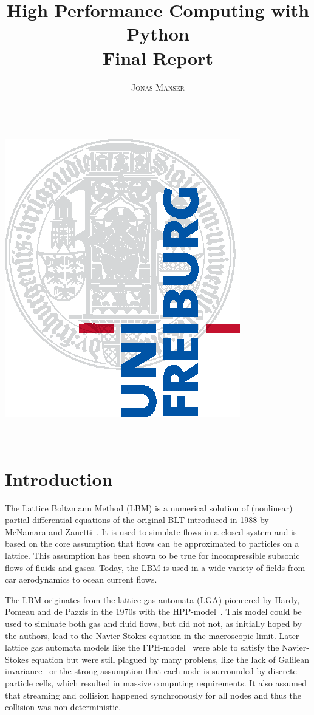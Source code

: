 \documentclass[a4paper,11pt]{article}
\title{\Huge \textbf{High Performance Computing with Python} \vspace{4mm} \\ \huge Final Report}
\author{\textsc{Jonas Manser} \\ \vspace{3mm}\text{matriculation number}  \\
\vspace{3mm}\text{jonas.burster@gmail.com}}
\begin{document}
\makeatletter
\begin{titlepage}
  \begin{center}
    \includegraphics[width=0.5\linewidth]{logos/Uni_Logo-Grundversion_E1_A4_CMYK.eps}\\[4ex]
    {\huge \bfseries  \@title }\\[2ex]
    {\LARGE  \@author}\\[30ex]
    {\large \@date}
  \end{center}
\end{titlepage}
\makeatother
\thispagestyle{empty}
\newpage



\tableofcontents
\clearpage


\section{Introduction}
The Lattice Boltzmann Method (LBM) is a numerical solution of (nonlinear) partial differential equations of the original BLT introduced in 1988 by McNamara and Zanetti~\cite{mcnamara1988boltzmann-method}.
It is used to simulate flows in a closed system and is based on the core assumption that flows can be approximated to particles on a lattice.
This assumption has been shown to be true for incompressible subsonic flows of fluids and gases.
Today, the LBM is used in a wide variety of fields from car aerodynamics to ocean current flows.

The LBM originates from the lattice gas automata (LGA) pioneered by Hardy, Pomeau and de Pazzis in the 1970s with the HPP-model~\cite{hardy1973timeHPP}.
This model could be used to simluate both gas and fluid flows, but did not not, as initially hoped by the authors, lead to the Navier-Stokes equation in the macroscopic limit.
Later lattice gas automata models like the FPH-model~\cite{PhysRevLett.56.1505-fhp} were able to satisfy the Navier-Stokes equation but were still plagued by many problens, like the lack of Galilean invariance~\cite{nie2008galileanInvariance} or the strong assumption
that each node is surrounded by discrete particle cells, which resulted in massive computing requirements.
It also assumed that streaming and collision happened synchronously for all nodes and thus the collision was non-deterministic.
\end{document}
